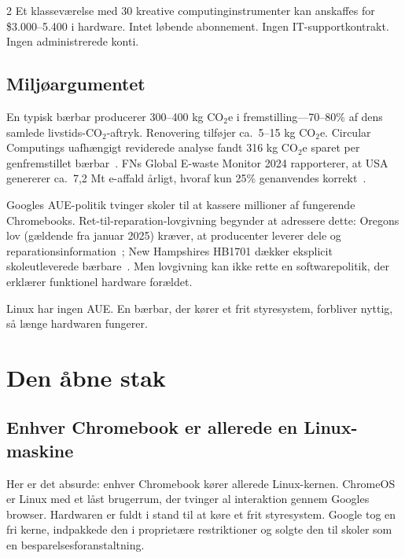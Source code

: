 \documentclass[11pt, a4paper]{article}
\begin{document}
\begin{multicols}{2}
Et klasseværelse med 30 kreative computinginstrumenter kan anskaffes for \$3.000--5.400 i hardware. Intet løbende abonnement. Ingen IT-supportkontrakt. Ingen administrerede konti.

\subsection{Miljøargumentet}

En typisk bærbar producerer 300--400 kg CO$_2$e i fremstilling---70--80\% af dens samlede livstids-CO$_2$-aftryk. Renovering tilføjer ca.\ 5--15 kg CO$_2$e. Circular Computings uafhængigt reviderede analyse fandt 316 kg CO$_2$e sparet per genfremstillet bærbar~\citep{circularcomputing2023carbon}. FNs Global E-waste Monitor 2024 rapporterer, at USA genererer ca.\ 7,2 Mt e-affald årligt, hvoraf kun 25\% genanvendes korrekt~\citep{un2024ewaste}.

Googles AUE-politik tvinger skoler til at kassere millioner af fungerende Chromebooks. Ret-til-reparation-lovgivning begynder at adressere dette: Oregons lov (gældende fra januar 2025) kræver, at producenter leverer dele og reparationsinformation~\citep{oregon2024repair}; New Hampshires HB1701 dækker eksplicit skoleutleverede bærbare~\citep{newhampshire2024repair}. Men lovgivning kan ikke rette en softwarepolitik, der erklærer funktionel hardware forældet.

Linux har ingen AUE. En bærbar, der kører et frit styresystem, forbliver nyttig, så længe hardwaren fungerer.


\section{Den åbne stak}

\subsection{Enhver Chromebook er allerede en Linux-maskine}

Her er det absurde: enhver Chromebook kører allerede Linux-kernen. ChromeOS er Linux med et låst brugerrum, der tvinger al interaktion gennem Googles browser. Hardwaren er fuldt i stand til at køre et frit styresystem. Google tog en fri kerne, indpakkede den i proprietære restriktioner og solgte den til skoler som en besparelsesforanstaltning.


\end{multicols}
\end{document}

